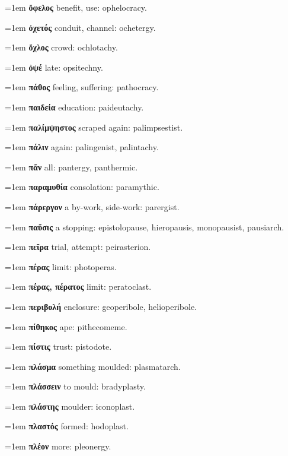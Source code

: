 \hangindent=1em \textbf{ὄφελος} benefit, use: ophelocracy.\par
\hangindent=1em \textbf{ὀχετός} conduit, channel: ochetergy.\par
\hangindent=1em \textbf{ὄχλος} crowd: ochlotachy.\par
\hangindent=1em \textbf{ὀψέ} late: opsitechny.\par
\hangindent=1em \textbf{πάθος} feeling, suffering: pathocracy.\par
\hangindent=1em \textbf{παιδεία} education: paideutachy.\par
\hangindent=1em \textbf{παλίμψηστος} scraped again: palimpsestist.\par
\hangindent=1em \textbf{πάλιν} again: palingenist, palintachy.\par
\hangindent=1em \textbf{πᾶν} all: pantergy, panthermic.\par
\hangindent=1em \textbf{παραμυθία} consolation: paramythic.\par
\hangindent=1em \textbf{πάρεργον} a by-work, side-work: parergist.\par
\hangindent=1em \textbf{παῦσις} a stopping: epistolopause, hieropausis, monopausist, pausiarch.\par
\hangindent=1em \textbf{πεῖρα} trial, attempt: peirasterion.\par
\hangindent=1em \textbf{πέρας} limit: photoperas.\par
\hangindent=1em \textbf{πέρας, πέρατος} limit: peratoclast.\par
\hangindent=1em \textbf{περιβολή} enclosure: geoperibole, helioperibole.\par
\hangindent=1em \textbf{πίθηκος} ape: pithecomeme.\par
\hangindent=1em \textbf{πίστις} trust: pistodote.\par
\hangindent=1em \textbf{πλάσμα} something moulded: plasmatarch.\par
\hangindent=1em \textbf{πλάσσειν} to mould: bradyplasty.\par
\hangindent=1em \textbf{πλάστης} moulder: iconoplast.\par
\hangindent=1em \textbf{πλαστός} formed: hodoplast.\par
\hangindent=1em \textbf{πλέον} more: pleonergy.\par
